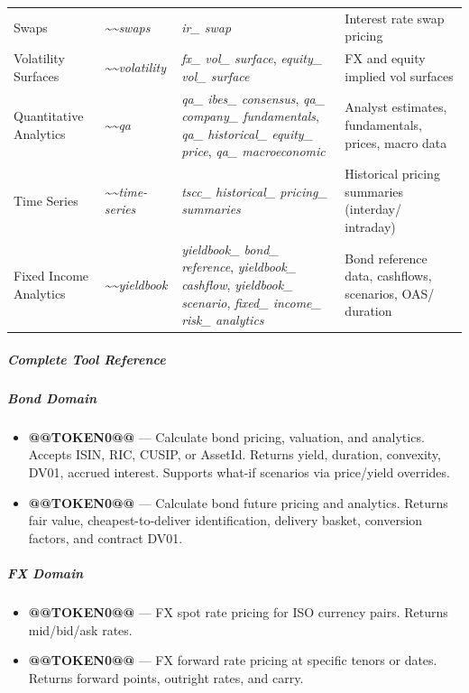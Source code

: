 \documentclass[11pt]{article}
\begin{document}
\begin{longtable}
{} Swaps & \emph{\textasciitilde{}\textasciitilde{}swaps} & \emph{ir\_\allowbreak{} swap} & Interest rate swap pricing \\
{} Volatility Surfaces & \emph{\textasciitilde{}\textasciitilde{}volatility} & \emph{fx\_\allowbreak{} vol\_\allowbreak{} surface}, \emph{equity\_\allowbreak{} vol\_\allowbreak{} surface} & FX and equity implied vol surfaces \\
{} Quantitative Analytics & \emph{\textasciitilde{}\textasciitilde{}qa} & \emph{qa\_\allowbreak{} ibes\_\allowbreak{} consensus}, \emph{qa\_\allowbreak{} company\_\allowbreak{} fundamentals}, \emph{qa\_\allowbreak{} historical\_\allowbreak{} equity\_\allowbreak{} price}, \emph{qa\_\allowbreak{} macroeconomic} & Analyst estimates, fundamentals, prices, macro data \\
{} Time Series & \emph{\textasciitilde{}\textasciitilde{}time-series} & \emph{tscc\_\allowbreak{} historical\_\allowbreak{} pricing\_\allowbreak{} summaries} & Historical pricing summaries (interday/ intraday) \\
{} Fixed Income Analytics & \emph{\textasciitilde{}\textasciitilde{}yieldbook} & \emph{yieldbook\_\allowbreak{} bond\_\allowbreak{} reference}, \emph{yieldbook\_\allowbreak{} cashflow}, \emph{yieldbook\_\allowbreak{} scenario}, \emph{fixed\_\allowbreak{} income\_\allowbreak{} risk\_\allowbreak{} analytics} & Bond reference data, cashflows, scenarios, OAS/ duration \\
\bottomrule
\end{longtable}
\endgroup

\subparagraph{Complete Tool Reference}\mbox{}\par

\subparagraph{Bond Domain}\mbox{}\par
\begin{itemize}[leftmargin=*,itemsep=2pt,topsep=2pt]
\item {} \textbf{@@TOKEN0@@} — Calculate bond pricing, valuation, and analytics. Accepts ISIN, RIC, CUSIP, or AssetId. Returns yield, duration, convexity, DV01, accrued interest. Supports what-if scenarios via price/yield overrides.
\item {} \textbf{@@TOKEN0@@} — Calculate bond future pricing and analytics. Returns fair value, cheapest-to-deliver identification, delivery basket, conversion factors, and contract DV01.
\end{itemize}

\subparagraph{FX Domain}\mbox{}\par
\begin{itemize}[leftmargin=*,itemsep=2pt,topsep=2pt]
\item {} \textbf{@@TOKEN0@@} — FX spot rate pricing for ISO currency pairs. Returns mid/bid/ask rates.
\item {} \textbf{@@TOKEN0@@} — FX forward rate pricing at specific tenors or dates. Returns forward points, outright rates, and carry.
\end{itemize}
\end{document}
